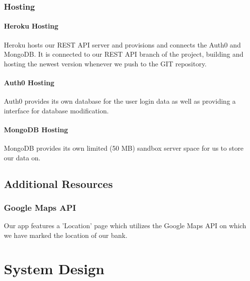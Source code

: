 \subsection{Hosting}
\subsubsection{Heroku Hosting}
Heroku hosts our REST API server and provisions and connects the Auth0 and MongoDB. It is connected to our REST API branch of the project, building and hosting the newest version whenever we push to the GIT repository.

\subsubsection{Auth0 Hosting}
Auth0 provides its own database for the user login data as well as providing a interface for database modification.

\subsubsection{MongoDB Hosting}
MongoDB provides its own limited (50 MB) sandbox server space for us to store our data on.

\section{Additional Resources}
\subsection{Google Maps API}
Our app features a 'Location' page which utilizes the Google Maps API on which we have marked the location of our bank.
\chapter{System Design}

